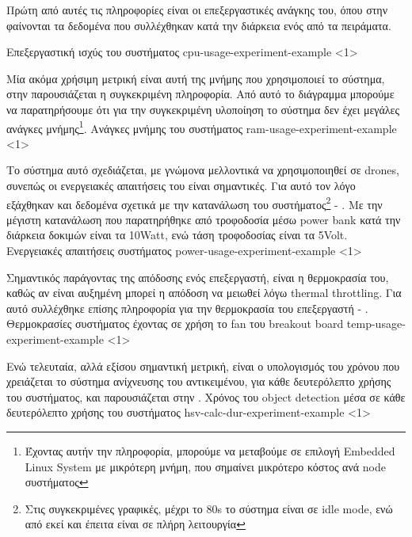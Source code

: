 Πρώτη από αυτές τις πληροφορίες είναι οι επεξεργαστικές ανάγκης του, όπου στην 
φαίνονται τα δεδομένα που συλλέχθηκαν κατά την διάρκεια ενός από τα πειράματα. 

{Επεξεργαστική ισχύς του συστήματος}%
{cpu-usage-experiment-example}%
<1>

Μία ακόμα χρήσιμη μετρική είναι αυτή της μνήμης που χρησιμοποιεί το σύστημα, στην 
παρουσιάζεται η συγκεκριμένη πληροφορία. Από αυτό το διάγραμμα μπορούμε να παρατηρήσουμε ότι για την συγκεκριμένη υλοποίηση το σύστημα δεν έχει μεγάλες ανάγκες μνήμης\footnote{Έχοντας αυτήν την πληροφορία, μπορούμε να μεταβούμε σε επιλογή Embedded Linux System με μικρότερη μνήμη, που σημαίνει μικρότερο κόστος ανά node συστήματος}.
{Ανάγκες μνήμης του συστήματος}%
{ram-usage-experiment-example}%
<1>

Το σύστημα αυτό σχεδιάζεται, με γνώμονα μελλοντικά να χρησιμοποιηθεί σε drones, συνεπώς οι ενεργειακές απαιτήσεις του είναι σημαντικές. Για αυτό τον λόγο ε\-ξά\-χθη\-καν και δεδομένα σχετικά με την κατανάλωση του συστήματος\footnote{Στις συγκεκριμένες γραφικές, μέχρι το 80s το σύστημα είναι σε idle mode, ενώ από εκεί και έπειτα είναι σε πλήρη λειτουργία} - . Με την μέγιστη κατανάλωση που παρατηρήθηκε από τροφοδοσία μέσω power bank κατά την διάρκεια δοκιμών είναι τα 10Watt, ενώ τάση τροφοδοσίας είναι τα 5Volt.
{Ενεργειακές απαιτήσεις συστήματος}%
{power-usage-experiment-example}%
<1>

Σημαντικός παράγοντας της απόδοσης ενός επεξεργαστή, είναι η θερμοκρασία του, καθώς αν είναι αυξημένη μπορεί η απόδοση να μειωθεί λόγω thermal throttling. Για αυτό συλλέχθηκε επίσης πληροφορία για την θερμοκρασία του επεξεργαστή - . 
{Θερμοκρασίες συστήματος έχοντας σε χρήση το fan του breakout board}%
{temp-usage-experiment-example}%
<1>

Ενώ τελευταία, αλλά εξίσου σημαντική μετρική, είναι ο υπολογισμός του χρόνου που χρειάζεται το σύστημα ανίχνευσης του αντικειμένου, για κάθε δευτερόλεπτο χρήσης του συστήματος, και παρουσιάζεται στην .
{Χρόνος του object detection μέσα σε κάθε δευτερόλεπτο χρήσης του συστήματος}%
{hsv-calc-dur-experiment-example}%
<1>

